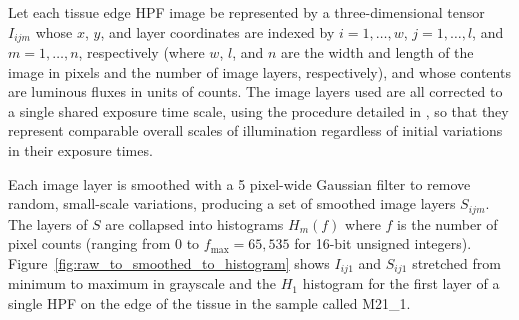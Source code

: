 \documentclass[letterpaper,11pt]{article}
\newcommand{\reffig}[1]{Figure~\ref{#1}}
\newcommand{\fmax}{f_{\mathrm{max}}}
\begin{document}
Let each tissue edge HPF image be represented by a three-dimensional tensor $I_{ijm}$ whose $x$, $y$, and layer coordinates are indexed by $i=1,\ldots,w$, $j=1,\ldots,l$, and $m=1,\ldots,n$, respectively (where $w$, $l$, and $n$ are the width and length of the image in pixels and the number of image layers, respectively), and whose contents are luminous fluxes in units of counts. The image layers used are all corrected to a single shared exposure time scale, using the procedure detailed in \cite{exposure_time_correction_note}, so that they represent comparable overall scales of illumination regardless of initial variations in their exposure times.

Each image layer is smoothed with a 5 pixel-wide Gaussian filter to remove random, small-scale variations, producing a set of smoothed image layers $S_{ijm}$. The layers of $S$ are collapsed into histograms $H_{m}(f)$ where $f$ is the number of pixel counts (ranging from 0 to $\fmax=65,535$ for 16-bit unsigned integers). \reffig{fig:raw_to_smoothed_to_histogram} shows $I_{ij1}$ and $S_{ij1}$ stretched from minimum to maximum in grayscale and the $H_{1}$ histogram for the first layer of a single HPF on the edge of the tissue in the sample called M21\_1. 
\end{document}
